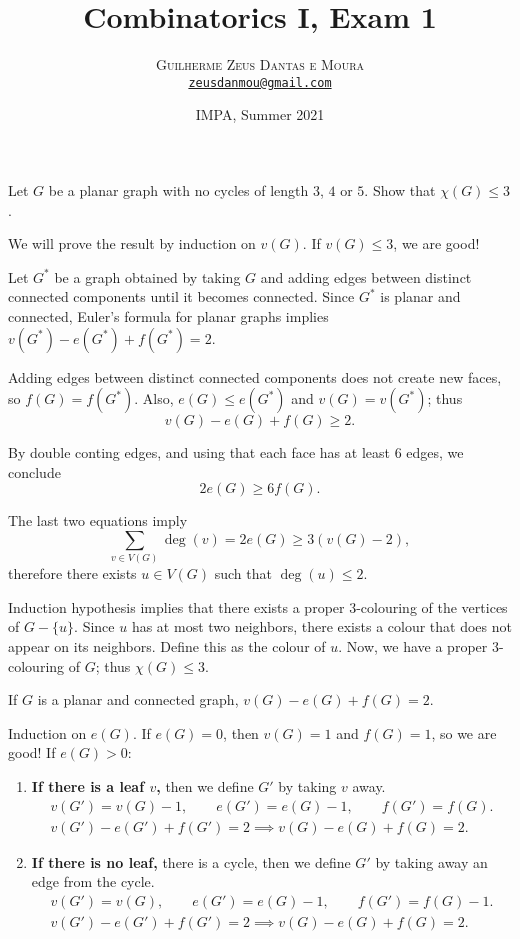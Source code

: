 \documentclass[10pt, a4paper]{article}
\title{\textbf{\textsf{Combinatorics I, Exam 1}}}
\author{\textsc{Guilherme Zeus Dantas e Moura}\\[2pt]\href{mailto:zeusdanmou@gmail.com}{\texttt{zeusdanmou@gmail.com}}}
\date{\vspace{-1ex}IMPA, Summer 2021}
\begin{document}
\maketitle

\begin{prob} 
	Let $G$ be a planar graph with no cycles of length $3$, $4$ or $5$. Show that $\chi(G) \le 3$.
\end{prob}

\begin{sol}
	We will prove the result by induction on $v(G)$. If $v(G) \le 3$, we are good!

	Let $G^*$ be a graph obtained by taking $G$ and adding edges between distinct connected components until it becomes connected. Since $G^*$ is planar and connected, Euler's formula for planar graphs implies $
		v(G^*) - e(G^*) + f(G^*) = 2.
	$

	Adding edges between distinct connected components does not create new faces, so $f(G) = f(G^*)$. Also, $e(G) \le e(G^*)$  and $v(G) = v(G^*)$; thus  \[
		v(G) - e(G) + f(G) \ge 2.
	\]

	By double conting edges, and using that each face has at least $6$ edges, we conclude \[
		2e(G) \ge 6f(G).
	\]

	The last two equations imply \[
		\sum_{v \in V(G)}\deg(v) = 2e(G) \ge 3(v(G) - 2),
	\]
	therefore there exists $u \in V(G)$ such that $\deg(u) \le 2$.

	Induction hypothesis implies that there exists a proper $3$-colouring of the vertices of $G - \{u\}$. Since $u$ has at most two neighbors, there exists a colour that does not appear on its neighbors. Define this as the colour of $u$. Now, we have a proper $3$-colouring of $G$; thus $\chi(G) \le 3$.
\end{sol}
\begin{thm}
	If $G$ is a planar and connected graph, $
		v(G) - e(G) + f(G) = 2$.
\end{thm}
\begin{dem}
	Induction on $e(G)$. If $e(G) = 0$, then $v(G) = 1$ and  $f(G) = 1$, so we are good! If $e(G) > 0$:

	\begin{enumerate}
		\item \textbf{If there is a leaf $v$,} then we define $G'$ by taking $v$ away.
			\begin{gather*}
				v(G') = v(G) - 1, \qquad
				e(G') = e(G) - 1, \qquad
				f(G') = f(G).     \\
				v(G') - e(G') + f(G') = 2 \implies v(G) - e(G) + f(G) = 2.
			\end{gather*}

		\item \textbf{If there is no leaf,} there is a cycle, then we define $G'$ by taking away an edge from the cycle.
			\begin{gather*}
				v(G') = v(G),     \qquad
				e(G') = e(G) - 1, \qquad
				f(G') = f(G) - 1. \\
				v(G') - e(G') + f(G') = 2 \implies v(G) - e(G) + f(G) = 2.
			\end{gather*}
	\end{enumerate}
\end{dem}
\end{document}
